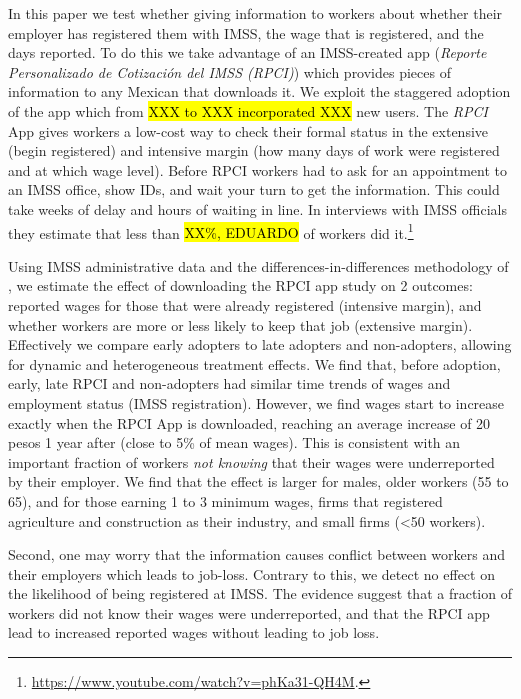 \documentclass[oneside,11pt]{article}
\begin{document}
In this paper we test whether giving information to workers about whether their employer has registered them with IMSS, the wage that is registered, and the days reported. To do this we take advantage of an IMSS-created app (\textit{Reporte Personalizado de Cotización del IMSS (RPCI)}) which provides  pieces of information to any Mexican that downloads it. We exploit the staggered adoption of the app which from \hl{XXX to XXX incorporated XXX} new users. The \textit{RPCI} App gives workers a low-cost way to check their formal status in the extensive (begin registered) and intensive margin (how many days of work were registered and at which wage level). Before RPCI workers had to ask for an appointment to an IMSS office, show IDs, and wait your turn to get the information. This could take weeks of delay and hours of waiting in line. In interviews with IMSS officials they estimate that less than \hl{XX\%, EDUARDO} of workers did it.\footnote{\url{https://www.youtube.com/watch?v=phKa31-QH4M}.}

Using IMSS administrative data and the differences-in-differences methodology of \cite{deChaisemartin2022}, we estimate the effect of downloading the RPCI app study on 2 outcomes: reported wages for those that were already registered (intensive margin), and whether workers are more or less likely to keep that job (extensive margin). Effectively we compare early adopters to late adopters and non-adopters, allowing for dynamic and heterogeneous treatment effects. We find that, before adoption, early, late RPCI and non-adopters had similar time trends of wages and employment status (IMSS registration). However, we find wages start to increase exactly when the RPCI App is downloaded, reaching an average increase of 20 pesos 1 year after (close to 5\% of mean wages). This is consistent with an important fraction of workers \textit{not knowing} that their wages were underreported by their employer. We find that the effect is larger for males, older workers (55 to 65), and for those earning 1 to 3 minimum wages, firms that registered agriculture and construction as their industry, and small firms (<50 workers).

Second, one may worry that the information causes conflict between workers and their employers which leads to job-loss. Contrary to this, we detect no effect on the likelihood of being registered at IMSS.  %
The evidence suggest that a fraction of workers did not know their wages were underreported, and that the RPCI app lead to increased reported wages without leading to job loss. 
\end{document}
